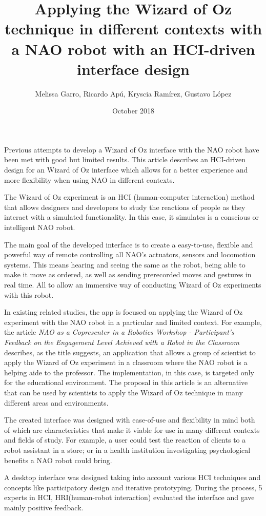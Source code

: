 \documentclass{article}
\title{Applying the Wizard of Oz technique in different contexts with a NAO robot with an HCI-driven interface design}
\author{Melissa Garro, Ricardo Apú, Kryscia Ramírez, Gustavo López}
\date{October 2018}
\begin{document}
\maketitle
    Previous attempts to develop a Wizard of Oz interface with the NAO robot have been met with good but limited results. This article describes an HCI-driven design for an Wizard of Oz interface which allows for a better experience and more flexibility when using NAO in different contexts.\par
    The Wizard of Oz experiment is an HCI (human-computer interaction) method that allows designers and developers to study the reactions of people as they interact with a simulated functionality\cite{wofoz}. In this case, it simulates is a conscious or intelligent NAO robot.\par
    The main goal of the developed interface is to create a easy-to-use, flexible and powerful way of remote controlling all NAO's actuators, sensors and locomotion systems. This means hearing and seeing the same as the robot, being able to make it move as ordered, as well as sending prerecorded moves and gestures in real time. All to allow an immersive way of conducting Wizard of Oz experiments with this robot.\par
    In existing related studies, the app is focused on applying the Wizard of Oz experiment with the NAO robot in a particular and limited context. For example, the article \textit{NAO as a Copresenter in a Robotics Workshop - Participant’s Feedback on the Engagement Level Achieved with a Robot in the Classroom}\cite{joseiby} describes, as the title suggests, an application that allows a group of scientist to apply the Wizard of Oz experiment in a classroom where the NAO robot is a helping aide to the professor. The implementation, in this case, is targeted only for the educational environment. The proposal in this article is an alternative that can be used by scientists to apply the Wizard of Oz technique in many different areas and environments.\par
    The created interface was designed with ease-of-use and flexibility in mind both of which are characteristics that make it viable for use in many different contexts and fields of study. For example, a user could test the reaction of clients to a robot assistant in a store; or in a health institution investigating psychological benefits a NAO robot could bring.\par
    A desktop interface was designed taking into account various HCI techniques and concepts like participatory design and iterative prototyping. During the process, 5 experts in HCI, HRI(human-robot interaction) evaluated the interface and gave mainly positive feedback.\par
\end{document}
